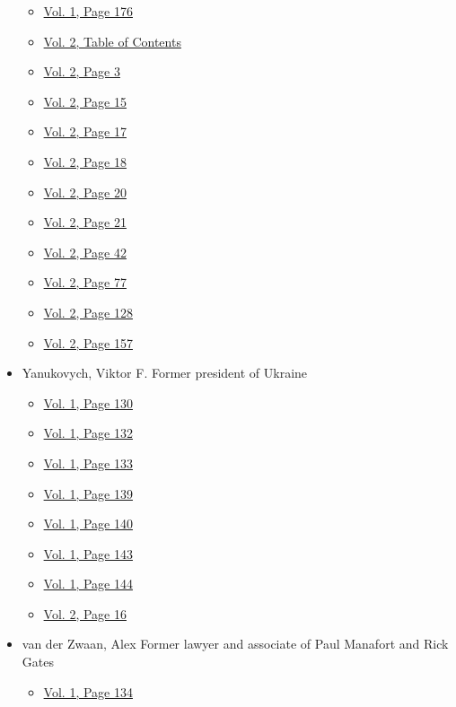 \begin{itemize}
\begin{itemize}
  \item
    \protect\hyperlink{g-page-184}{Vol. 1, Page 176}
  \item
    \protect\hyperlink{g-page-209}{Vol. 2, Table of Contents}
  \item
    \protect\hyperlink{g-page-215}{Vol. 2, Page 3}
  \item
    \protect\hyperlink{g-page-227}{Vol. 2, Page 15}
  \item
    \protect\hyperlink{g-page-229}{Vol. 2, Page 17}
  \item
    \protect\hyperlink{g-page-230}{Vol. 2, Page 18}
  \item
    \protect\hyperlink{g-page-232}{Vol. 2, Page 20}
  \item
    \protect\hyperlink{g-page-233}{Vol. 2, Page 21}
  \item
    \protect\hyperlink{g-page-254}{Vol. 2, Page 42}
  \item
    \protect\hyperlink{g-page-289}{Vol. 2, Page 77}
  \item
    \protect\hyperlink{g-page-340}{Vol. 2, Page 128}
  \item
    \protect\hyperlink{g-page-369}{Vol. 2, Page 157}
  \end{itemize}
\item
  Yanukovych, Viktor F. Former president of Ukraine

  \begin{itemize}
  \tightlist
  \item
    \protect\hyperlink{g-page-138}{Vol. 1, Page 130}
  \item
    \protect\hyperlink{g-page-140}{Vol. 1, Page 132}
  \item
    \protect\hyperlink{g-page-141}{Vol. 1, Page 133}
  \item
    \protect\hyperlink{g-page-147}{Vol. 1, Page 139}
  \item
    \protect\hyperlink{g-page-148}{Vol. 1, Page 140}
  \item
    \protect\hyperlink{g-page-151}{Vol. 1, Page 143}
  \item
    \protect\hyperlink{g-page-152}{Vol. 1, Page 144}
  \item
    \protect\hyperlink{g-page-228}{Vol. 2, Page 16}
  \end{itemize}
\item
  van der Zwaan, Alex Former lawyer and associate of Paul Manafort and
  Rick Gates

  \begin{itemize}
  \tightlist
  \item
    \protect\hyperlink{g-page-142}{Vol. 1, Page 134}
  \end{itemize}
\end{itemize}


